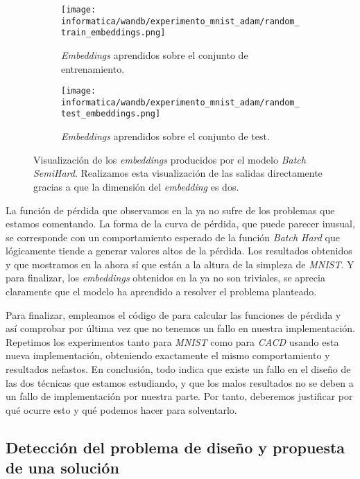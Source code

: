 \begin{figure} [!hbtp]
\ajustarsubcaptions
\centering
    \begin{subfigure}{.5\textwidth}
        \centering
        \texttt{[image: informatica/wandb/experimento\_mnist\_adam/random\_train\_embeddings.png]}
        \caption{\textit{Embeddings} aprendidos sobre el conjunto de entrenamiento.}
    \end{subfigure}%
    \begin{subfigure}{.5\textwidth}
        \centering
        \texttt{[image: informatica/wandb/experimento\_mnist\_adam/random\_test\_embeddings.png]}
        \caption{\textit{Embeddings} aprendidos sobre el conjunto de test.}
    \end{subfigure}
\caption{Visualización de los \textit{embeddings} producidos por el modelo \textit{Batch SemiHard}. Realizamos esta visualización de las salidas directamente gracias a que la dimensión del \textit{embedding} es dos.}
\label{img:embeddings_adam_random}
\end{figure}

La función de pérdida que observamos en la  ya no sufre de los problemas que estamos comentando. La forma de la curva de pérdida, que puede parecer inusual, se corresponde con un comportamiento esperado de la función \textit{Batch Hard} que lógicamente tiende a generar valores altos de la pérdida. Los resultados obtenidos y que mostramos en la  ahora sí que están a la altura de la simpleza de \textit{MNIST}. Y para finalizar, los \textit{embeddings} obtenidos en la  ya no son triviales, se aprecia claramente que el modelo ha aprendido a resolver el problema planteado.

Para finalizar, empleamos el código de \cite{informatica:implementacion_batch_distancias} para calcular las funciones de pérdida y así comprobar por última vez que no tenemos un fallo en nuestra implementación. Repetimos los experimentos tanto para \textit{MNIST} como para \textit{CACD} usando esta nueva implementación, obteniendo exactamente el mismo comportamiento y resultados nefastos. En conclusión, todo indica que existe un fallo en el diseño de las dos técnicas que estamos estudiando, y que los malos resultados no se deben a un fallo de implementación por nuestra parte. Por tanto, deberemos justificar por qué ocurre esto y qué podemos hacer para solventarlo.

\subsection{Detección del problema de diseño y propuesta de una solución} \label{isubsec:identificacion_problemas_propuesta_solucion}


